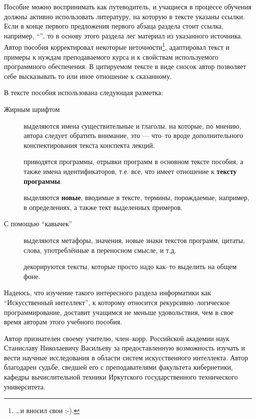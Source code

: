 \documentclass[12pt, openany, twoside]{book} %
\begin{document}
Пособие можно воспринимать как путеводитель, и учащиеся в процессе обучения должны активно использовать литературу, на которую в тексте указаны ссылки. Если в конце первого предложения первого абзаца раздела стоит ссылка, например, ``\cite{AIDictionary}'', то в основу этого раздела лег материал из указанного источника. Автор пособия корректировал некоторые неточности\footnote{\ldots и вносил свои ;-).}, адаптировал текст и примеры к нуждам преподаваемого курса и к свойствам используемого программного обеспечения. В цитируемом тексте в виде сносок автор позволяет себе высказывать то или иное отношение к сказанному.

В тексте пособия использована следующая разметка:
\begin{description}
\item[Жирным шрифтом] выделяются имена существительные и глаголы, на которые, по мнению, автора следует обратить внимание, это --- что--то вроде дополнительного конспектирования текста конспекта лекций.
\item[] приводятся программы, отрывки программ в основном тексте пособия, а также имена идентификаторов, т.е. все, что имеет отношение к {\bf тексту программы}.
\item[] выделяются {\bf новые}, вводимые в тексте, термины, порождаемые, например, в определениях, а также тект выделенных примеров.
\item[\normalfont С помощью ``кавычек''] выделяются метафоры, значения, новые знаки текстов программ, цитаты, слова,
употреблённые в переносном смысле, и т.д.
\item[] декориру\-ют\-ся тексты, которые просто надо как--то выделить на общем фоне.
\end{description}

Надеюсь, что изучение такого интересного раздела информатики как ``Искусственный интеллект'', к которому относится рекурсивно--логическое программирование, доставит учащимся не меньше удовольствия, чем в свое время авторам этого учебного пособия.

Автор признателен своему учителю, член--корр. Российской академии наук Станиславу Николаевичу Васильеву за предоставленную возможность изучать и вести научные исследования в области систем искусственного интеллекта. Автор благодарен судьбе, сведшей его с преподавателями факультета кибернетики, кафедры вычислительной техники Иркутского государственного технического университета.
\end{document}

